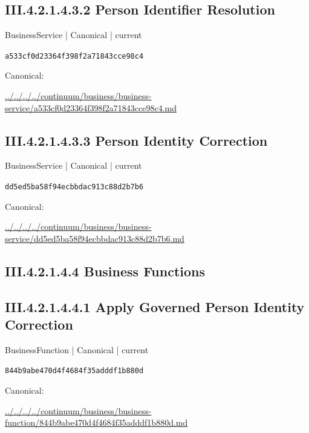 \documentclass[10pt,a4paper]{article}
\begin{document}
\subsection*{III.4.2.1.4.3.2 Person Identifier Resolution}
\label{element-a533cf0d23364f398f2a71843cce98c4}
{\small BusinessService | Canonical | current}\par
\texttt{a533cf0d23364f398f2a71843cce98c4}\par
Canonical: \par
{\footnotesize\url{../../../../continuum/business/business-service/a533cf0d23364f398f2a71843cce98c4.md}}\par
\subsection*{III.4.2.1.4.3.3 Person Identity Correction}
\label{element-dd5ed5ba58f94ecbbdac913c88d2b7b6}
{\small BusinessService | Canonical | current}\par
\texttt{dd5ed5ba58f94ecbbdac913c88d2b7b6}\par
Canonical: \par
{\footnotesize\url{../../../../continuum/business/business-service/dd5ed5ba58f94ecbbdac913c88d2b7b6.md}}\par
\subsection*{III.4.2.1.4.4 Business Functions}
\subsection*{III.4.2.1.4.4.1 Apply Governed Person Identity Correction}
\label{element-844b9abe470d4f4684f35adddf1b880d}
{\small BusinessFunction | Canonical | current}\par
\texttt{844b9abe470d4f4684f35adddf1b880d}\par
Canonical: \par
{\footnotesize\url{../../../../continuum/business/business-function/844b9abe470d4f4684f35adddf1b880d.md}}\par
\end{document}
